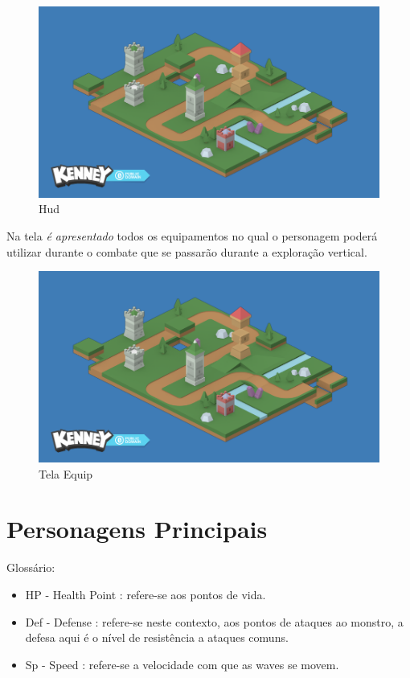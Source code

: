 \documentclass[11pt]{article} %
\begin{document}
\begin{figure}[!htp]
\centering
\includegraphics[scale=0.25]{res/map_example.png}
\caption{Hud}
\label{HUD}
\end{figure}

Na tela \textit{é apresentado} todos os equipamentos no qual o personagem poderá utilizar durante o combate que se passarão durante a exploração vertical.

\begin{figure}[!htp]
\centering
\includegraphics[scale=0.25]{res/map_example.png}
\caption{Tela Equip}
\label{Tela Equip}
\end{figure}

\newpage

\section{Personagens Principais}

Glossário:
\begin{itemize}
\item HP - Health Point : refere-se aos pontos de vida.
\item Def - Defense : refere-se neste contexto, aos pontos de ataques ao monstro, a defesa aqui é o nível de resistência a ataques comuns.
\item Sp - Speed : refere-se a velocidade com que as waves se movem.
\end{itemize}
\end{document}
